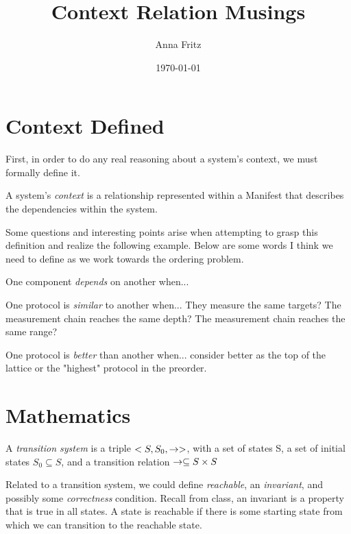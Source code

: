 \documentclass[12pt, letterpaper]{article}
\title{Context Relation Musings}
\author{Anna Fritz}
\date{\today}
\begin{document}
\maketitle

\section{Context Defined}

First, in order to do any real reasoning about a system's context, we must formally define it. 

\begin{defn}[Context]
  A system's \emph{context} is a relationship represented within a Manifest that describes the dependencies within the system. 
\end{defn}

Some questions and interesting points arise when attempting to grasp this definition and realize the following example. Below are some words I think we need to define as we work towards the ordering problem. 

\begin{defn}[Dependency] 
  One component \emph{depends} on another when... 
\end{defn}

\begin{defn}[Similar] 
  One protocol is \emph{similar} to another when... They measure the same targets? The measurement chain reaches the same depth? The measurement chain reaches the same range? 
\end{defn}

\begin{defn}[Better] 
  One protocol is \emph{better} than another when... consider better as the top of the lattice or the "highest" protocol in the preorder. 
\end{defn}

\section{Mathematics}

\begin{defn}
  A \emph{transition system} is a triple $<S,S_0, \to>$, with a set of states S, a set of initial states $S_0 \subseteq S$, and a transition relation $\to \subseteq S \times S$ \cite{FRAP}
\end{defn}

Related to a transition system, we could define \emph{reachable}, an \emph{invariant}, and possibly some \emph{correctness} condition. Recall from class, an invariant is a property that is true in all states. A state is reachable if there is some starting state from which we can transition to the reachable state. 
\end{document}
